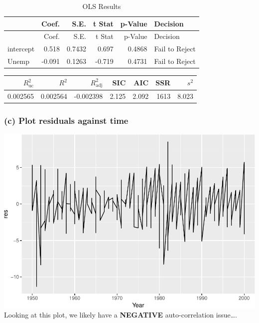 \documentclass[11pt,]{article}
\newenvironment{Shaded}{\begin{snugshade}}{\end{snugshade}}
\newcommand{\KeywordTok}[1]{\textcolor[rgb]{0.13,0.29,0.53}{\textbf{#1}}}
\newcommand{\DataTypeTok}[1]{\textcolor[rgb]{0.13,0.29,0.53}{#1}}
\newcommand{\DecValTok}[1]{\textcolor[rgb]{0.00,0.00,0.81}{#1}}
\newcommand{\StringTok}[1]{\textcolor[rgb]{0.31,0.60,0.02}{#1}}
\newcommand{\OperatorTok}[1]{\textcolor[rgb]{0.81,0.36,0.00}{\textbf{#1}}}
\newcommand{\NormalTok}[1]{#1}
\begin{document}
\begin{longtable}[]{@{}lrrrrl@{}}
\caption{OLS Results}\tabularnewline
\toprule
& Coef. & S.E. & t Stat & p-Value & Decision\tabularnewline
\midrule
\endfirsthead
\toprule
& Coef. & S.E. & t Stat & p-Value & Decision\tabularnewline
\midrule
\endhead
intercept & 0.518 & 0.7432 & 0.697 & 0.4868 & Fail to
Reject\tabularnewline
Unemp & -0.091 & 0.1263 & -0.719 & 0.4731 & Fail to
Reject\tabularnewline
\bottomrule
\end{longtable}

\begin{Shaded}
\end{Shaded}

\begin{longtable}[]{@{}rrrrrrr@{}}
\toprule
\(R^2_\text{uc}\) & \(R^2\) & \(R^2_\text{adj}\) & SIC & AIC & SSR &
\(s^2\)\tabularnewline
\midrule
\endhead
0.002565 & 0.002564 & -0.002398 & 2.125 & 2.092 & 1613 &
8.023\tabularnewline
\bottomrule
\end{longtable}

\subsubsection{(c) Plot residuals against
time}\label{c-plot-residuals-against-time}

\begin{Shaded}
\end{Shaded}

\includegraphics{ps4_code_files/figure-latex/plot_resid-1.pdf} Looking
at this plot, we likely have a \textbf{NEGATIVE} auto-correlation
issue\ldots{}.
\end{document}

